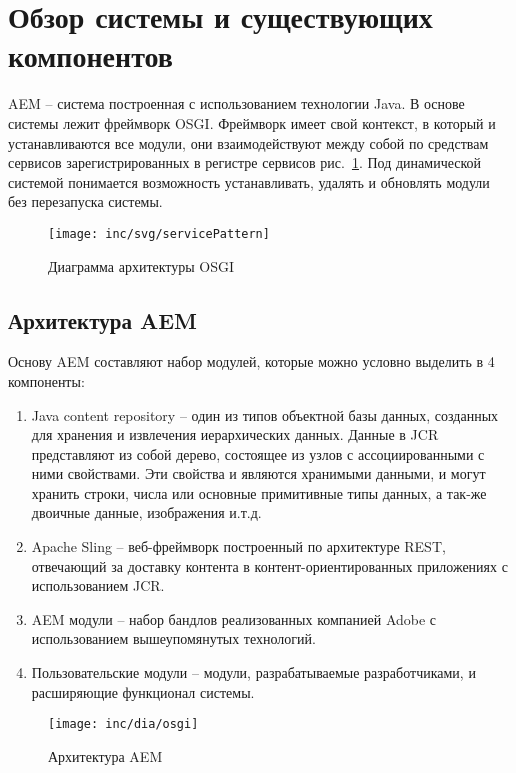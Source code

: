 \section{Обзор системы и существующих компонентов}

AEM – система построенная с использованием технологии Java. В основе системы лежит фреймворк OSGI. Фреймворк имеет свой контекст, в который и устанавливаются все модули, они взаимодействуют между собой по средствам сервисов зарегистрированных в регистре сервисов рис.~\ref{fig:servicePattern}. Под динамической системой понимается возможность устанавливать, удалять и обновлять модули без перезапуска системы.

\begin{figure}[h]
  \centering
  \texttt{[image: inc/svg/servicePattern]}
  \caption{Диаграмма архитектуры OSGI}
  \label{fig:servicePattern}
\end{figure}

\subsection{Архитектура AEM}
Основу AEM составляют набор модулей, которые можно условно выделить в 4 компоненты:
\begin{enumerate}
\item Java content repository – один из типов объектной базы данных, созданных для хранения и извлечения иерархических данных. Данные в JCR представляют из собой дерево, состоящее из узлов с ассоциированными с ними свойствами. Эти свойства и являются хранимыми данными, и могут хранить строки, числа или основные примитивные типы данных, а так-же двоичные данные, изображения и.т.д. 
\item Apache Sling – веб-фреймворк построенный по архитектуре REST, отвечающий за доставку контента в контент-ориентированных приложениях с использованием JCR.
\item AEM модули – набор бандлов реализованных компанией Adobe с использованием вышеупомянутых технологий.
\item Пользовательские модули – модули, разрабатываемые разработчиками, и расширяющие функционал системы.
\end{enumerate}

\begin{figure}[h]
  \centering
  \texttt{[image: inc/dia/osgi]}
  \caption{Архитектура AEM}
  \label{fig:fig02}
\end{figure}

